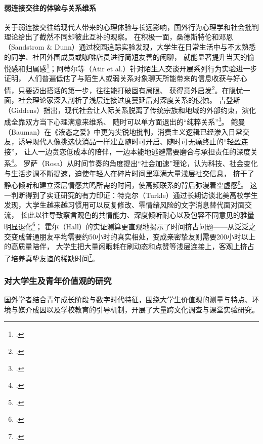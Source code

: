 \paragraph{弱连接交往的体验与关系维系}
关于弱连接交往给现代人带来的心理体验与长远影响，国外行为心理学和社会批判理论给出了截然不同却彼此互补的观察。
在积极一面，桑德斯特伦和邓恩（Sandstrom \& Dunn）通过校园追踪实验发现，大学生在日常生活中与不太熟悉的同学、社团外围成员或咖啡店员进行简短友善的闲聊，
就能显著提升当天的愉悦感和归属感\footcite{Sandstrom2014}；阿蒂尔等（Atir et al.）针对陌生人交谈开展系列行为实验进一步证明，
人们普遍低估了与陌生人或弱关系对象聊天所能带来的信息收获与好心情，只要迈出搭话的第一步，往往能打破固有局限、
获得意外启发\footcite{doi:10.1073/pnas.2206992119}。在隐忧一面，社会理论家深入剖析了浅层连接过度蔓延后对深度关系的侵蚀。
吉登斯（Giddens）指出，现代社会让人际关系脱离了传统宗族和地域的外部约束，演化成全靠双方当下心理满意来维系、
随时可以单方面退出的“纯粹关系”\footcite{Giddens1998}。
鲍曼（Bauman）在《液态之爱》中更为尖锐地批判，消费主义逻辑已经渗入日常交友，诱导现代人像挑选快消品一样建立随时可开启、随时可无痛终止的“轻盈连接”，
让人一边贪恋低成本的陪伴，一边本能地逃避需要磨合与承担责任的深度关系\footcite{Bauman2003}。
罗萨（Rosa）从时间节奏的角度提出“社会加速”理论，认为科技、社会变化与生活步调不断提速，迫使年轻人在碎片时间里塞满大量浅层社交信息，
挤干了静心倾听和建立深层情感共鸣所需的时间，使高频联系的背后弥漫着空虚感\footcite{Rosa2015}。
这一判断得到了实证研究的有力印证：特克尔（Turkle）通过长期访谈北美高校学生发现，大学生越来越习惯用可以反复修改、零情绪风险的文字消息替代面对面交流，
长此以往导致察言观色的共情能力、深度倾听耐心以及包容不同意见的雅量明显退化\footcite{Turkle2015}；
霍尔（Hall）的实证测算更直观地揭示了时间挤占问题——从泛泛之交变成普通朋友平均需要约50小时的真实相处，变成亲密挚友则需要200小时以上的高质量陪伴，
大学生把大量闲暇耗在刷动态和点赞等浅层连接上，客观上挤占了培养真挚友谊的稀缺时间\footcite{Hall2019}。

\subsubsection{对大学生及青年价值观的研究}

国外学者结合青年成长阶段与数字时代特征，围绕大学生价值观的测量与特点、环境与媒介成因以及学校教育的引导机制，开展了大量跨文化调查与课堂实验研究。

